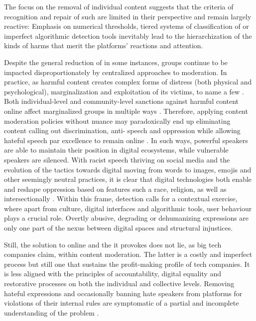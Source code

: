 \documentclass[output=paper,colorlinks,citecolor=brown]{langscibook}
\begin{document}
The focus on the removal of individual content suggests that the criteria of recognition and repair of such  are limited in their perspective and remain largely reactive: Emphasis on numerical thresholds, tiered systems of classification of  or imperfect algorithmic detection tools inevitably lead to the hierarchization of the kinds of harms that merit the platforms' reactions and attention. 

Despite the general reduction of  in some instances,  groups continue to be impacted disproportionately by centralized approaches to moderation. In practice,  as harmful content creates complex forms of distress (both physical and psychological), marginalization and exploitation of its victims, to name a few \citep{schoenebeck_blackwell2021}.  Both individual-level and community-level sanctions against harmful content online affect marginalized groups in multiple ways \citep[23]{gilbert2023}. Therefore, applying content moderation policies without nuance may paradoxically end up eliminating content calling out discrimination, anti- speech and oppression while allowing hateful speech par excellence to remain online \citep{marshall2021}. In such ways, powerful speakers are able to maintain their position in digital ecosystems, while vulnerable speakers are silenced. With racist speech thriving on social media and the evolution of the tactics towards digital  moving from words to images, emojis and other seemingly neutral practices, it is clear that digital technologies both enable and reshape oppression based on features such a race, religion,  as well as intersectionally \citep[206]{matamoros-fernandez_farkas2021}. Within this frame,  detection calls for a contextual exercise, where apart from culture, digital interfaces and algorithmic tools, user behaviour plays a crucial role. Overtly abusive, degrading or dehumanizing expressions are only one part of the nexus between digital spaces and structural injustices.

Still, the solution to online  and the  it provokes does not lie, as big tech companies claim, within content moderation. The latter is a costly and imperfect process but still one that sustains the profit-making profile of tech companies. It is less aligned with the principles of accountability, digital equality and restorative processes on both the individual and collective levels. Removing hateful expressions and occasionally banning hate speakers from platforms for violations of their internal rules are symptomatic of a partial and incomplete understanding of the problem \citep{salehi2020}. 
\end{document}
